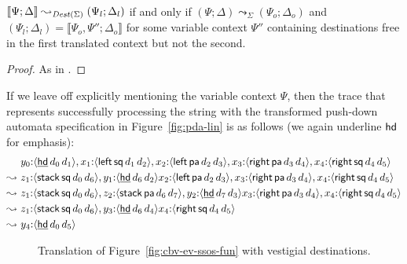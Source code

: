 \begin{theorem}~\\\label{thm:destcorrect}
$\llbracket \Psi; \Delta \rrbracket \leadsto_{{\it Dest}(\Sigma)}
 (\Psi_l; \Delta_l)$ if and only if 
$(\Psi; \Delta) \leadsto_\Sigma (\Psi_o; \Delta_o)$ and
$(\Psi_l; \Delta_l) = \llbracket \Psi_o, \Psi''; \Delta_o \rrbracket$ 
for some variable 
context $\Psi''$ containing destinations free in the first translated
context but not the second.
\end{theorem}

\begin{proof}
As in \cite[Theorem 2]{simmons11logical}.
\end{proof}


If we leave off explicitly mentioning the variable context $\Psi$, 
then the trace that represents successfully processing 
the string {\sf [ ( ) ] }
with the transformed push-down automata 
specification in Figure~\ref{fig:pda-lin} 
is as follows (we again underline ${\sf hd}$
for emphasis):
\begin{align*}
           & y_0{:}\langle {\underline{\sf hd}\,d_0\,d_1} \rangle,
             x_1{:}\langle {{\sf left}\,{\sf sq}\,d_1\,d_2} \rangle,
             x_2{:}\langle {{\sf left}\,{\sf pa}\,d_2\,d_3} \rangle,
             x_3{:}\langle {{\sf right}\,{\sf pa}\,d_3\,d_4} \rangle,
             x_4{:}\langle {{\sf right}\,{\sf sq}\,d_4\,d_5} \rangle
\\
\leadsto ~ & z_1{:}\langle {{\sf stack}\,{\sf sq}\,d_0\,d_6} \rangle,
             y_1{:}\langle {\underline{\sf hd}\,d_6\,d_2} \rangle
             x_2{:}\langle {{\sf left}\,{\sf pa}\,d_2\,d_3} \rangle,
             x_3{:}\langle {{\sf right}\,{\sf pa}\,d_3\,d_4} \rangle,
             x_4{:}\langle {{\sf right}\,{\sf sq}\,d_4\,d_5} \rangle
\\
\leadsto ~ & z_1{:}\langle {{\sf stack}\,{\sf sq}\,d_0\,d_6} \rangle,
             z_2{:}\langle {{\sf stack}\,{\sf pa}\,d_6\,d_7} \rangle,
             y_2{:}\langle {\underline{\sf hd}\,d_7\,d_3} \rangle
             x_3{:}\langle {{\sf right}\,{\sf pa}\,d_3\,d_4} \rangle,
             x_4{:}\langle {{\sf right}\,{\sf sq}\,d_4\,d_5} \rangle
\\
\leadsto ~ & z_1{:}\langle {{\sf stack}\,{\sf sq}\,d_0\,d_6} \rangle,
             y_3{:}\langle {\underline{\sf hd}\,d_6\,d_4} \rangle
             x_4{:}\langle {{\sf right}\,{\sf sq}\,d_4\,d_5} \rangle
\\
\leadsto ~ & y_4{:}\langle {\underline{\sf hd}\,d_0\,d_5} \rangle
\end{align*}


\begin{figure}[t]
\caption{Translation of Figure~\ref{fig:cbv-ev-ssos-fun} with vestigial destinations.}
\label{fig:dest-vestige}
\end{figure}

